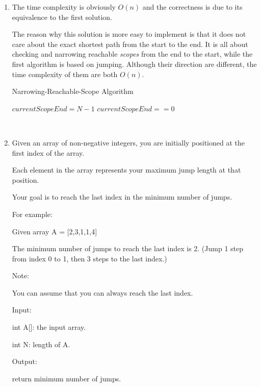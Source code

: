 \documentclass[12pt,a4paper]{article}
\makeatletter
\newtheorem*{solution}{Solution}
\renewenvironment{solution}[1][Solution] {\par\pushQED{\qed}\normalfont\topsep6\p@\@plus6\p@\relax\trivlist\item[\hskip\labelsep\bfseries#1\@addpunct{.}]\ignorespaces}{\popQED\endtrivlist\@endpefalse} \makeatother
\makeatother
\begin{document}
\begin{enumerate}
\begin{solution}
The time complexity is obviously $O(n)$ and the correctness is due to its equivalence to the first solution.

The reason why this solution is more easy to implement is that it does not care about the exact shortest path from the start to the end. It is all about checking and narrowing reachable \emph{scopes} from the end to the start, while the first algorithm is based on jumping. Although their direction are different, the time complexity of them are both $O(n)$.

\begin{algorithm} 
  \label{alg:solution2}
  \caption{Narrowing-Reachable-Scope Algorithm} 
  $currentScopeEnd = N-1$\; 
  \Return $currentScopeEnd==0$\; 
\end{algorithm}



\end{solution}

~\\


\item Given an array of non-negative integers, you are initially positioned at the first index of the array.

Each element in the array represents your maximum jump length at that position.

Your goal is to reach the last index in the minimum number of jumps.

For example:

Given array A = [2,3,1,1,4]

The minimum number of jumps to reach the last index is 2. (Jump 1 step from index 0 to 1, then 3 steps to the last index.)

Note:

You can assume that you can always reach the last index.

Input:

int A[]: the input array.

int N: length of A.

Output:

return minimum number of jumps.


\end{enumerate}
\end{document}
